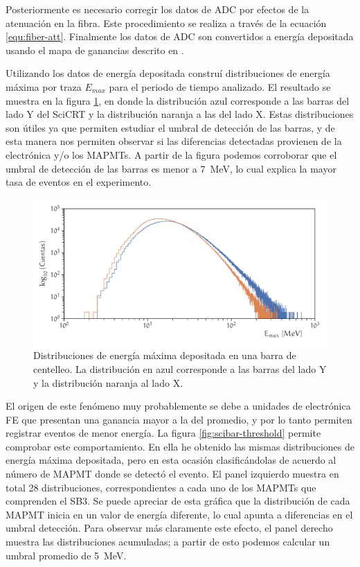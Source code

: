 Posteriormente es necesario corregir los datos de ADC por efectos de la atenuación en la fibra. Este procedimiento se realiza a través de la ecuación \ref{equ:fiber-att}. Finalmente los datos de ADC son convertidos a energía depositada usando el mapa de ganancias descrito en \cite{hikimochi16}.

Utilizando los datos de energía depositada construí distribuciones de energía máxima por traza $E_{max}$ para el periodo de tiempo analizado. El resultado se muestra en la figura \ref{fig:neutron-mindep}, en donde la distribución azul corresponde a las barras del lado Y del SciCRT y la distribución naranja a las del lado X. Estas distribuciones son útiles ya que permiten estudiar el umbral de detección de las barras, y de esta manera nos permiten observar si las diferencias detectadas provienen de la electrónica y/o los MAPMTs. A partir de la figura podemos corroborar que el umbral de detección de las barras es menor a \SI{7}{\mega\electronvolt}, lo cual explica la mayor tasa de eventos en el experimento.

\begin{figure}
        \centering
        \includegraphics[width=\textwidth]{neutron-mindep.pdf}
        \caption{Distribuciones de energía máxima depositada en una barra de centelleo. La distribución en azul corresponde a las barras del lado Y y la distribución naranja al lado X.}
        \label{fig:neutron-mindep}
\end{figure}

El origen de este fenómeno muy probablemente se debe a unidades de electrónica FE que presentan una ganancia mayor a la del promedio, y por lo tanto permiten registrar eventos de menor energía. La figura \ref{fig:scibar-threshold} permite comprobar este comportamiento. En ella he obtenido las mismas distribuciones de energía máxima depositada, pero en esta ocasión clasificándolas de acuerdo al número de MAPMT donde se detectó el evento. El panel izquierdo muestra en total \num{28} distribuciones, correspondientes a cada uno de los MAPMTs que comprenden el SB3. Se puede apreciar de esta gráfica que la distribución de cada MAPMT inicia en un valor de energía diferente, lo cual apunta a diferencias en el umbral detección. Para observar más claramente este efecto, el panel derecho muestra las distribuciones acumuladas; a partir de esto podemos calcular un umbral promedio de \SI{5}{\mega\electronvolt}.


